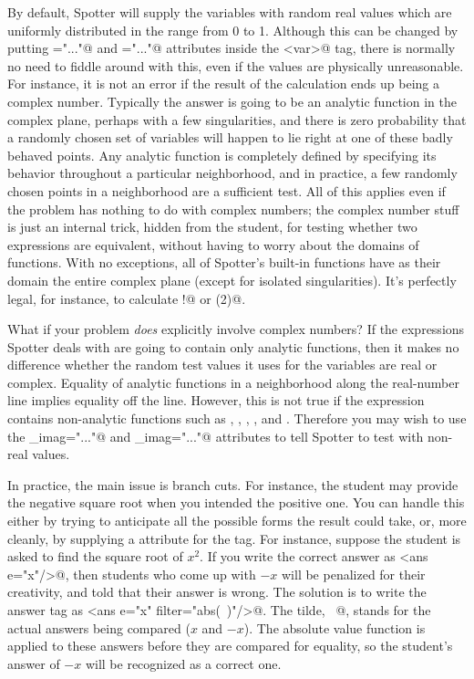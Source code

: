 \documentclass{doc}
\begin{document}
By default, Spotter will
 supply the variables with random real values which are uniformly distributed
in the range from 0 to 1. Although this can be changed by putting
\verb@min="..."@ and \verb@max="..."@ attributes inside the \verb@<var>@ tag,
 there is normally no need to fiddle around with this, even if
the values are physically unreasonable. For instance, it is not an error if the
result of the calculation ends up being a complex number. Typically the answer
is going to be an analytic function in the complex plane, perhaps with a few singularities,
 and there is zero probability that a randomly chosen set of variables will
happen to lie right at one of these badly behaved points. Any analytic function
is completely defined by specifying its behavior throughout a particular neighborhood, and in practice,
a few randomly chosen points in a neighborhood are a sufficient test. All of this applies even if
the problem has nothing to do with complex numbers; the complex number stuff is
just an internal trick, hidden from the student, for testing whether two expressions
are equivalent, without having to worry about the domains of functions. With no
exceptions, all of Spotter's built-in functions have as their domain the entire
complex plane (except for isolated singularities). It's perfectly legal, for instance,
to calculate !@ or \verb@acos(2)@.

What if your problem \emph{does} explicitly involve complex numbers? If the expressions
Spotter deals with are going to contain only analytic functions, then it makes no difference
whether the random test values it uses for the variables are real or complex. Equality
of analytic functions in a neighborhood along the real-number line implies equality off the line.
However, this is not true if the expression contains non-analytic functions such as
\verb@abs@, \verb@Re@, \verb@Im@, \verb@arg@, and \verb@conj@. Therefore
 you may wish to
use the \verb@min_imag="..."@ and \verb@max_imag="..."@ attributes to tell Spotter
to test with non-real values.

In practice, the main issue is branch cuts. For instance, the student may provide the
negative square root when you intended the positive one. You can handle this either
by trying to anticipate all the possible forms the result could take, or, more cleanly,
 by supplying a \verb@filter@ attribute for the \verb@ans@ tag. For instance, suppose the
 student is asked to find the square root of $x^2$. If you write the correct answer
 as \verb@<ans e="x"/>@, then students who come up with $-x$ will be penalized for
 their creativity, and told that their answer is wrong. The solution is to write
 the answer tag as \verb@<ans e="x" filter="abs(~)"/>@.
 The tilde, \verb@~@, stands for the actual answers being compared ($x$ and $-x$).
 The absolute value function is applied to these answers before they are compared
 for equality, so the student's answer of $-x$ will be recognized as a correct one.
  
\end{document}
